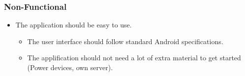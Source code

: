 \subsubsection{Non-Functional}

\begin{itemize}
\item The application should be easy to use.
\begin{itemize}
\item The user interface should follow standard Android specifications. 
\item The applification should not need a lot of extra material to get started (Power devices, own server).
\end{itemize}
\end{itemize}


